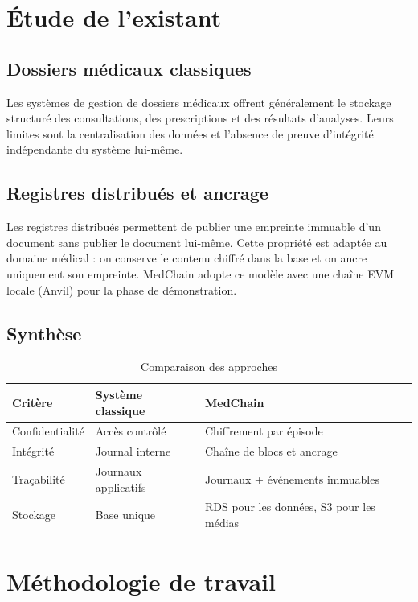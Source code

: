 \section{Étude de l'existant}

\subsection{Dossiers médicaux classiques}

Les systèmes de gestion de dossiers médicaux offrent généralement le stockage structuré des consultations, des prescriptions et des résultats d'analyses. Leurs limites sont la centralisation des données et l'absence de preuve d'intégrité indépendante du système lui-même.

\subsection{Registres distribués et ancrage}

Les registres distribués permettent de publier une empreinte immuable d'un document sans publier le document lui-même. Cette propriété est adaptée au domaine médical : on conserve le contenu chiffré dans la base et on ancre uniquement son empreinte. MedChain adopte ce modèle avec une chaîne EVM locale (Anvil) pour la phase de démonstration.

\subsection{Synthèse}

\begin{table}[H]
\centering
\renewcommand{\arraystretch}{1.3}
\begin{tabular}{|l|p{4cm}|p{4cm}|}
\hline
\textbf{Critère} & \textbf{Système classique} & \textbf{MedChain} \\
\hline
Confidentialité & Accès contrôlé & Chiffrement par épisode \\
\hline
Intégrité & Journal interne & Chaîne de blocs et ancrage \\
\hline
Traçabilité & Journaux applicatifs & Journaux + événements immuables \\
\hline
Stockage & Base unique & RDS pour les données, S3 pour les médias \\
\hline
\end{tabular}
\caption{Comparaison des approches}
\end{table}

\section{Méthodologie de travail}

